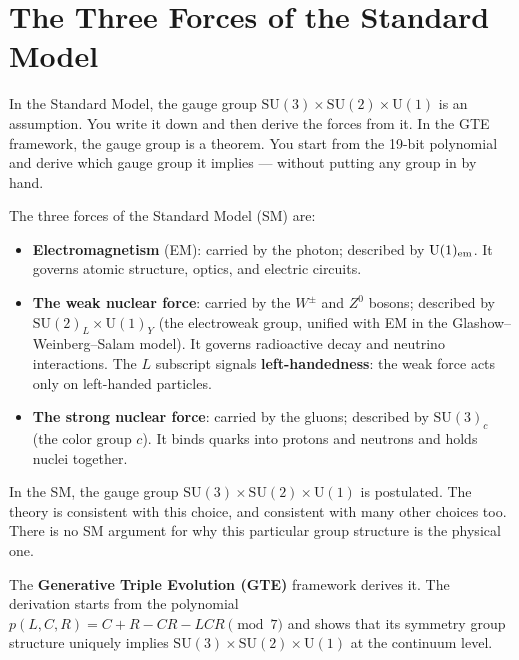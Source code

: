 \documentclass[11pt,a4paper]{article}
\newcommand{\term}[1]{\textbf{#1}}
\begin{document}
\section{The Three Forces of the Standard Model}
\label{sec:forces-intro}

\begin{tcolorbox}[colback=boxblue,colframe=blue!40!black,title=The central claim]
In the Standard Model, the gauge group
$\mathrm{SU}(3) \times \mathrm{SU}(2) \times \mathrm{U}(1)$ is an assumption.
You write it down and then derive the forces from it.
In the GTE framework, the gauge group is a theorem.
You start from the 19-bit polynomial and derive which gauge group it implies ---
without putting any group in by hand.
\end{tcolorbox}

The three forces of the Standard Model (SM) are:

\begin{itemize}[itemsep=4pt]
  \item \textbf{Electromagnetism} (EM): carried by the photon; described by
        $\mathrm{U}(1)_{\rm em}$.
        It governs atomic structure, optics, and electric circuits.

  \item \textbf{The weak nuclear force}: carried by the $W^{\pm}$ and $Z^0$
        bosons; described by $\mathrm{SU}(2)_L \times \mathrm{U}(1)_Y$
        (the electroweak group, unified with EM in the Glashow--Weinberg--Salam
        model).
        It governs radioactive decay and neutrino interactions.
        The $L$ subscript signals \term{left-handedness}: the weak force
        acts only on left-handed particles.

  \item \textbf{The strong nuclear force}: carried by the gluons;
        described by $\mathrm{SU}(3)_c$ (the color group $c$).
        It binds quarks into protons and neutrons and holds nuclei together.
\end{itemize}

In the SM, the gauge group $\mathrm{SU}(3) \times \mathrm{SU}(2) \times \mathrm{U}(1)$
is postulated.
The theory is consistent with this choice, and consistent with many other choices
too.
There is no SM argument for why this particular group structure is the physical one.

The \term{Generative Triple Evolution (GTE)} framework derives it.
The derivation starts from the polynomial $p(L,C,R) = C + R - CR - LCR \pmod{7}$
and shows that its symmetry group structure uniquely implies
$\mathrm{SU}(3) \times \mathrm{SU}(2) \times \mathrm{U}(1)$ at the continuum level.
\end{document}
